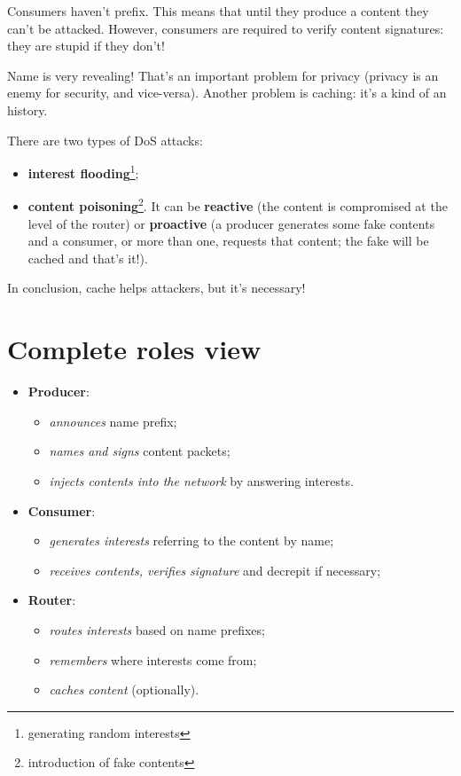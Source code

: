 Consumers haven't prefix. This means that until they produce a content they
can't be attacked. However, consumers are required to verify content
signatures: they are stupid if they don't!

Name is very revealing! That's an important problem for privacy (privacy is an
enemy for security, and vice-versa). Another problem is caching: it's a kind of
an history.

There are two types of DoS attacks:
\begin{itemize}
  \item \textbf{interest flooding}\footnote{generating random interests};
  \item \textbf{content poisoning}\footnote{introduction of fake contents}. It
can be \textbf{reactive} (the content is compromised at the level of the
router) or \textbf{proactive} (a producer generates some fake contents and a
consumer, or more than one, requests that content; the fake will be cached and
that's it!).
\end{itemize}
In conclusion, cache helps attackers, but it's necessary!

\section{Complete roles view}
\begin{itemize}
  \item \textbf{Producer}:
  \begin{itemize}
    \item \textit{announces} name prefix;
    \item \textit{names and signs} content packets;
    \item \textit{injects contents into the network} by answering interests.
  \end{itemize}
  \item \textbf{Consumer}:
  \begin{itemize}
    \item \textit{generates interests} referring to the content by name;
    \item \textit{receives contents, verifies signature} and decrepit if
necessary;
  \end{itemize}
  \item \textbf{Router}:
  \begin{itemize}
    \item \textit{routes interests} based on name prefixes;
    \item \textit{remembers} where interests come from;
    \item \textit{caches content} (optionally).
  \end{itemize}
\end{itemize}
